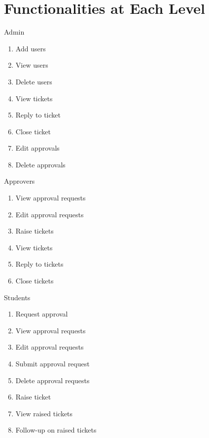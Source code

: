 \documentclass{beamer}
\begin{document}
\section{Functionalities at Each Level}
\begin{frame}{Admin}
\begin{enumerate}
\item Add users
\item View users
\item Delete users
\item View tickets
\item Reply to ticket
\item Close ticket
\item Edit approvals
\item Delete approvals
\end{enumerate}
\end{frame} 

\begin{frame}{Approvers}
\begin{enumerate}
\item View approval requests
\item Edit approval requests
\item Raise tickets
\item View tickets
\item Reply to tickets
\item Close tickets
\end{enumerate}
\end{frame}

\begin{frame}{Students}
\begin{enumerate}
\item Request approval
\item View approval requests
\item Edit approval requests
\item Submit approval request
\item Delete approval requests
\item Raise ticket
\item View raised tickets
\item Follow-up on raised tickets
\end{enumerate}
\end{frame}
\end{document}
